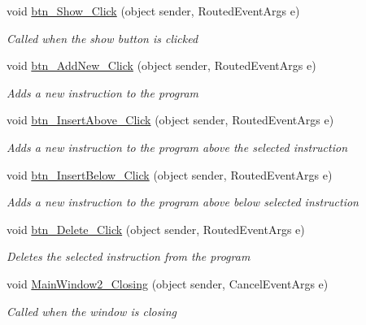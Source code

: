 \begin{DoxyCompactItemize}
void \hyperlink{class_c_p_u___o_s___simulator_1_1_main_window_afcb6e2b3719374f56fd8cb1c786bb219}{btn\+\_\+\+Show\+\_\+\+Click} (object sender, Routed\+Event\+Args e)
\begin{DoxyCompactList}\small\item\em Called when the show button is clicked \end{DoxyCompactList}\item 
void \hyperlink{class_c_p_u___o_s___simulator_1_1_main_window_a37c97ac2869b40063089f1af9cd86724}{btn\+\_\+\+Add\+New\+\_\+\+Click} (object sender, Routed\+Event\+Args e)
\begin{DoxyCompactList}\small\item\em Adds a new instruction to the program \end{DoxyCompactList}\item 
void \hyperlink{class_c_p_u___o_s___simulator_1_1_main_window_a8f710b1bee7b3c9360fb5652231b0502}{btn\+\_\+\+Insert\+Above\+\_\+\+Click} (object sender, Routed\+Event\+Args e)
\begin{DoxyCompactList}\small\item\em Adds a new instruction to the program above the selected instruction \end{DoxyCompactList}\item 
void \hyperlink{class_c_p_u___o_s___simulator_1_1_main_window_ac2307db4caedc82b5a6201077fb1c5b7}{btn\+\_\+\+Insert\+Below\+\_\+\+Click} (object sender, Routed\+Event\+Args e)
\begin{DoxyCompactList}\small\item\em Adds a new instruction to the program above below selected instruction \end{DoxyCompactList}\item 
void \hyperlink{class_c_p_u___o_s___simulator_1_1_main_window_a96ea1acde80b84701b58c1d4aaed2b9f}{btn\+\_\+\+Delete\+\_\+\+Click} (object sender, Routed\+Event\+Args e)
\begin{DoxyCompactList}\small\item\em Deletes the selected instruction from the program \end{DoxyCompactList}\item 
void \hyperlink{class_c_p_u___o_s___simulator_1_1_main_window_a622fd6a40ff66a4a87c3d31ccef4313c}{Main\+Window2\+\_\+\+Closing} (object sender, Cancel\+Event\+Args e)
\begin{DoxyCompactList}\small\item\em Called when the window is closing \end{DoxyCompactList}\item 

\end{DoxyCompactItemize}
